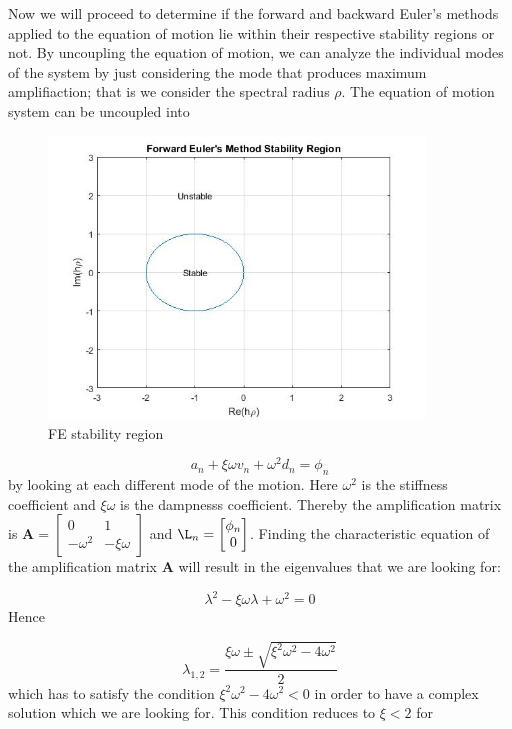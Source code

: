 \documentclass{article}
\begin{document}
Now we will proceed to determine if the forward and backward Euler's methods applied to the equation of motion lie within their respective stability regions or not. By uncoupling the equation of motion, we can analyze the individual modes of the system by just considering the mode that produces maximum amplifiaction; that is we consider the spectral radius $\rho$. The equation of motion system can be uncoupled into 
				\begin{figure}[h!]
   					\centering
   					\includegraphics[width=100mm]{GraphEulerF.jpg}
					\centering
   					\caption{FE stability region}
				           \label{fig5}
  				\end{figure}

				\begin{equation}
					a_n + \xi\omega v_n + \omega^2 d_n = \phi_n
				\end{equation}
by looking at each different mode of the motion. Here $\omega^2$ is the stiffness coefficient and $\xi \omega$ is the dampnesss coefficient.
Thereby the amplification matrix is $\textbf{A} = \begin{bmatrix}0 & 1 \\ -\omega^2 & -\xi\omega \end{bmatrix}$ and $\L_n = \begin{bmatrix}\phi_n \\ 0 \end{bmatrix}$. Finding the characteristic equation of the amplification matrix $\textbf{A}$ will result in the eigenvalues that we are looking for:

				\begin{equation}
					\lambda^2 -\xi\omega\lambda + \omega^2 = 0
				\end{equation}
Hence 

				\begin{equation}
					\lambda_{1,2} = \frac{\xi\omega \pm \sqrt{\xi^2\omega^2 - 4\omega^2}}{2}
				\end{equation}
which has to satisfy the condition $\xi^2\omega^2-4\omega^2 < 0$ in order to have a complex solution which we are looking for. This condition reduces to $\xi < 2$ for
\end{document}

